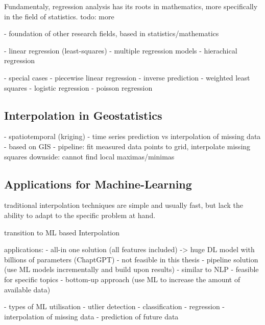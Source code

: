 Fundamentaly, regression analysis has its roots in mathematics, more specifically in the field of statistics.
todo: more

- foundation of other research fields, based in statistics/mathematics

- linear regression (least-squares)
- multiple regression models
- hierachical regression

- special cases
    - piecewise linear regression
    - inverse prediction
    - weighted least squares
    - logistic regression
    - poisson regression

\subsection{Interpolation in Geostatistics}

- spatiotemporal (kriging)
- time series prediction vs interpolation of missing data
- based on GIS 
- pipeline: fit measured data points to grid, interpolate missing squares
downside: cannot find local maximas/minimas

\subsection{Applications for Machine-Learning}

traditional interpolation techniques are simple and usually fast, but lack the ability to adapt to the specific problem at hand.

transition to ML based Interpolation

applications:
- all-in one solution (all features included) -> huge DL model with billions of parameters (ChaptGPT)
    - not feasible in this thesis
- pipeline solution (use ML models incrementally and build upon results)
    - similar to NLP
    - feasible for specific topics
    - bottom-up approach (use ML to increase the amount of available data)

- types of ML utilisation
    - utlier detection
    - classification
    - regression
        - interpolation of missing data
        - prediction of future data
